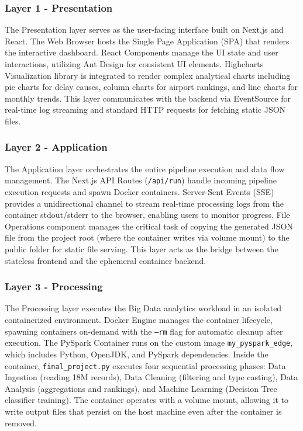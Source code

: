 \documentclass[12pt,a4paper]{report}
\begin{document}
\subsubsection{Layer 1 - Presentation}

The Presentation layer serves as the user-facing interface built on Next.js and React. The Web Browser hosts the Single Page Application (SPA) that renders the interactive dashboard. React Components manage the UI state and user interactions, utilizing Ant Design for consistent UI elements. Highcharts Visualization library is integrated to render complex analytical charts including pie charts for delay causes, column charts for airport rankings, and line charts for monthly trends. This layer communicates with the backend via EventSource for real-time log streaming and standard HTTP requests for fetching static JSON files.

\subsubsection{Layer 2 - Application}

The Application layer orchestrates the entire pipeline execution and data flow management. The Next.js API Routes (\texttt{/api/run}) handle incoming pipeline execution requests and spawn Docker containers. Server-Sent Events (SSE) provides a unidirectional channel to stream real-time processing logs from the container stdout/stderr to the browser, enabling users to monitor progress. File Operations component manages the critical task of copying the generated JSON file from the project root (where the container writes via volume mount) to the public folder for static file serving. This layer acts as the bridge between the stateless frontend and the ephemeral container backend.

\subsubsection{Layer 3 - Processing}

The Processing layer executes the Big Data analytics workload in an isolated containerized environment. Docker Engine manages the container lifecycle, spawning containers on-demand with the \texttt{--rm} flag for automatic cleanup after execution. The PySpark Container runs on the custom image \texttt{my\_pyspark\_edge}, which includes Python, OpenJDK, and PySpark dependencies. Inside the container, \texttt{final\_project.py} executes four sequential processing phases: Data Ingestion (reading 18M records), Data Cleaning (filtering and type casting), Data Analysis (aggregations and rankings), and Machine Learning (Decision Tree classifier training). The container operates with a volume mount, allowing it to write output files that persist on the host machine even after the container is removed.
\end{document}

